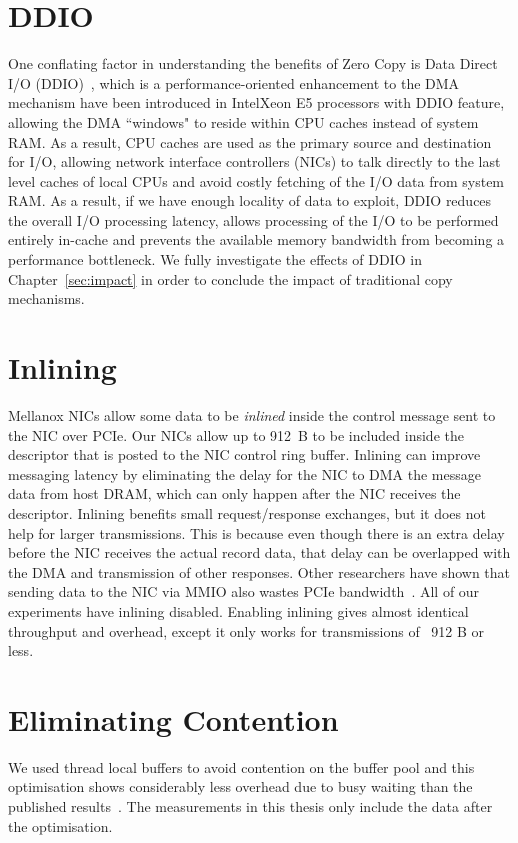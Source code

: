 \section{DDIO}
One conflating factor in understanding the benefits of Zero Copy is Data Direct I/O (DDIO)~\cite{ddio}, which is a performance-oriented enhancement 
to the DMA mechanism have been introduced in Intel\textregistered Xeon E5 processors with DDIO feature,
allowing the DMA ``windows" to reside within CPU caches instead of system RAM. As a result,
CPU caches are used as the primary source and destination for I/O, 
allowing network interface controllers (NICs) to talk directly to the last level caches of local CPUs
and avoid costly fetching of the I/O data from system RAM. As a result, if we have enough locality of data to exploit,
DDIO reduces the overall I/O processing latency, allows processing of the I/O 
to be performed entirely in-cache and prevents the available memory bandwidth from becoming a performance bottleneck.
We fully investigate the effects of DDIO in Chapter~\ref{sec:impact} in order to conclude the impact of 
traditional copy mechanisms.


\section{Inlining}
Mellanox NICs allow some data to be {\em inlined} inside the control message
sent to the NIC over PCIe. Our NICs allow up to 912~B to be included inside the
descriptor that is posted to the NIC control ring buffer.  Inlining can improve
messaging latency by eliminating the delay for the NIC to DMA the message data
from host DRAM, which can only happen after the NIC receives the descriptor.
Inlining benefits small request/response exchanges, but it does not help for
larger transmissions. This is because even though there is an extra delay
before the NIC receives the actual record data, that delay can be overlapped
with the DMA and transmission of other responses. Other researchers have shown
that sending data to the NIC via MMIO also wastes PCIe bandwidth~\cite{rdma}.
All of our experiments have inlining disabled. Enabling inlining gives almost identical throughput and overhead, except it only
works for transmissions of ~912 B or less.

\section{Eliminating Contention}
We used thread local buffers to avoid contention on the buffer pool and this optimisation shows considerably less 
overhead due to busy waiting than the published results~\cite{imdmpaper}. The measurements in this thesis only include the
data after the optimisation.


